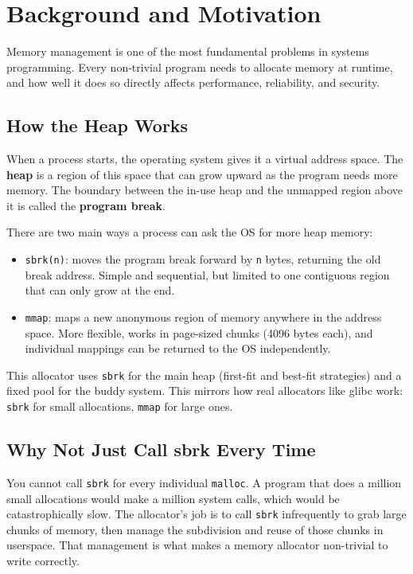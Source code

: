 \documentclass[12pt, a4paper]{report}
\begin{document}
\chapter{Background and Motivation}

Memory management is one of the most fundamental problems in systems
programming. Every non-trivial program needs to allocate memory at runtime, and
how well it does so directly affects performance, reliability, and security.

\section{How the Heap Works}

When a process starts, the operating system gives it a virtual address space.
The \textbf{heap} is a region of this space that can grow upward as the program
needs more memory. The boundary between the in-use heap and the unmapped region
above it is called the \textbf{program break}.

There are two main ways a process can ask the OS for more heap memory:

\begin{itemize}
  \item \texttt{sbrk(n)}: moves the program break forward by \texttt{n} bytes,
    returning the old break address. Simple and sequential, but limited to one
    contiguous region that can only grow at the end.
  \item \texttt{mmap}: maps a new anonymous region of memory anywhere in the
    address space. More flexible, works in page-sized chunks (4096 bytes each),
    and individual mappings can be returned to the OS independently.
\end{itemize}

This allocator uses \texttt{sbrk} for the main heap (first-fit and best-fit
strategies) and a fixed pool for the buddy system. This mirrors how real
allocators like glibc work: \texttt{sbrk} for small allocations, \texttt{mmap}
for large ones.

\section{Why Not Just Call sbrk Every Time}

You cannot call \texttt{sbrk} for every individual \texttt{malloc}. A program
that does a million small allocations would make a million system calls, which
would be catastrophically slow. The allocator's job is to call \texttt{sbrk}
infrequently to grab large chunks of memory, then manage the subdivision and
reuse of those chunks in userspace. That management is what makes a memory
allocator non-trivial to write correctly.
\end{document}

